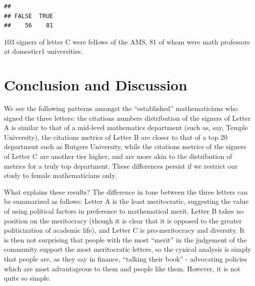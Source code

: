 \documentclass[]{article}
\newenvironment{Shaded}{\begin{snugshade}}{\end{snugshade}}
\newcommand{\KeywordTok}[1]{\textcolor[rgb]{0.13,0.29,0.53}{\textbf{#1}}}
\newcommand{\NormalTok}[1]{#1}
\newcommand{\OperatorTok}[1]{\textcolor[rgb]{0.81,0.36,0.00}{\textbf{#1}}}
\newcommand{\StringTok}[1]{\textcolor[rgb]{0.31,0.60,0.02}{#1}}
\begin{document}
\begin{Shaded}
\end{Shaded}

\begin{verbatim}
## 
## FALSE  TRUE 
##    56    81
\end{verbatim}

103 signers of letter C were fellows of the AMS, 81 of whom were math
professors at domesticr1 universities.

\hypertarget{conclusion-and-discussion}{%
\section{Conclusion and Discussion}\label{conclusion-and-discussion}}

We see the following patterns amongst the ``established'' mathematicians
who signed the three letters: the citations numbers distribution of the
signers of Letter A is similar to that of a mid-level mathematics
department (such as, say, Temple University), the citations metrics of
Letter B are closer to that of a top 20 department such as Rutgers
University, while the citations metrics of the signers of Letter C are
another tier higher, and are more akin to the distribution of metrics
for a truly top department. These differences persist if we restrict our
study to female mathematicians only.

What explains these results? The difference in tone between the three
letters can be summarized as follows: Letter A is the least
meritocratic, suggesting the value of using political factors in
preference to mathematical merit. Letter B takes no position on the
meritocracy (though it is clear that it is opposed to the greater
politicization of academic life), and Letter C is pro-meritocracy and
diversity. It is then not surprising that people with the most ``merit''
in the judgement of the community support the most meritocratic letters,
so the cynical analysis is simply that people are, as they say in
finance, ``talking their book'' - advocating policies which are most
advantageous to them and people like them. However, it is not quite so
simple.
\end{document}
